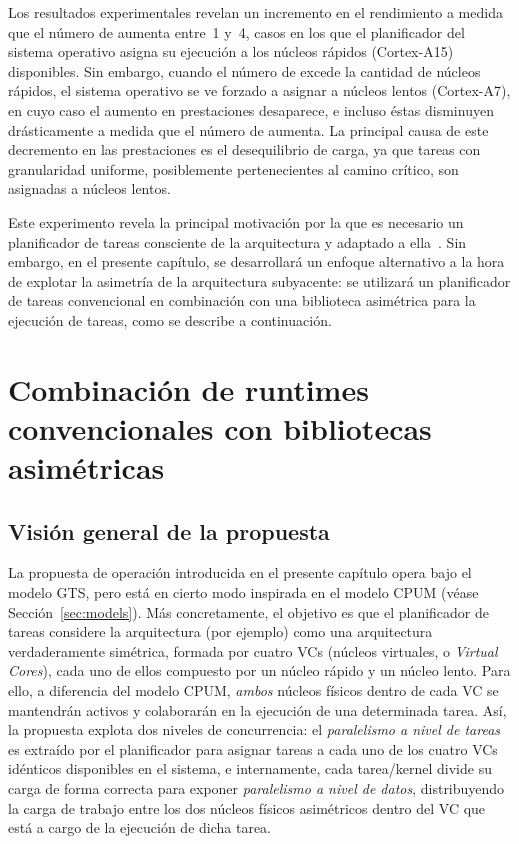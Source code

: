 Los resultados experimentales revelan un incremento en el rendimiento a medida que el número de \wts aumenta entre~1 y~4,
casos en los que el planificador del sistema operativo asigna su ejecución a los núcleos rápidos (Cortex-A15) disponibles.
Sin embargo, cuando el número de \wts excede la cantidad de núcleos rápidos, el sistema operativo se ve forzado a asignar
\wts a núcleos lentos (Cortex-A7), en cuyo caso el aumento en prestaciones desaparece, e incluso éstas disminuyen drásticamente 
a medida que el número de \wts aumenta. La principal causa de este decremento en las prestaciones es el desequilibrio de carga,
ya que tareas con granularidad uniforme, posiblemente pertenecientes al camino crítico, son asignadas a núcleos lentos.

Este experimento revela la principal motivación por la que es necesario un planificador de tareas consciente de la
arquitectura y adaptado a ella~\cite{OmpSsbigLITTLE}. Sin embargo, en el presente capítulo, se desarrollará un enfoque alternativo
a la hora de explotar la asimetría de la arquitectura subyacente: se utilizará un planificador de tareas convencional en combinación
con una biblioteca asimétrica para la ejecución de tareas, como se describe a continuación.

\section{Combinación de runtimes convencionales con bibliotecas asimétricas}

\subsection{Visión general de la propuesta}

La propuesta de operación introducida en el presente capítulo opera bajo el modelo GTS, pero está en cierto modo 
inspirada en el modelo CPUM (véase Sección~\ref{sec:models}). Más concretamente, el objetivo es que el planificador
de tareas considere la arquitectura \odroid (por ejemplo) como una arquitectura verdaderamente simétrica, formada por 
cuatro VCs (núcleos virtuales, o {\em Virtual Cores}), cada uno de ellos compuesto por un núcleo rápido y un núcleo
lento. Para ello, a diferencia del modelo CPUM, {\em ambos} núcleos físicos dentro de cada VC se mantendrán activos y 
colaborarán en la ejecución de una determinada tarea. Así, la propuesta explota dos niveles de concurrencia: el {\em paralelismo
a nivel de tareas} es extraído por el planificador para asignar tareas a cada uno de los cuatro VCs idénticos disponibles en
el sistema, e internamente, cada tarea/kernel divide su carga de forma correcta para exponer {\em paralelismo a nivel de datos}, 
distribuyendo la carga de trabajo entre los dos núcleos físicos asimétricos dentro del VC que está a cargo de la ejecución
de dicha tarea.

